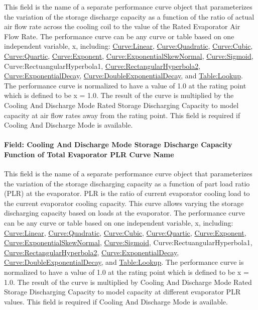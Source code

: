 This field is the name of a separate performance curve object that parameterizes the variation of the storage discharge capacity as a function of the ratio of actual air flow rate across the cooling coil to the value of the Rated Evaporator Air Flow Rate. The performance curve can be any curve or table based on one independent variable, x, including: \hyperref[curvelinear]{Curve:Linear}, \hyperref[curvequadratic]{Curve:Quadratic}, \hyperref[curvecubic]{Curve:Cubic}, \hyperref[curvequartic]{Curve:Quartic}, \hyperref[curveexponent]{Curve:Exponent}, \hyperref[curveexponentialskewnormal]{Curve:ExponentialSkewNormal}, \hyperref[curvesigmoid]{Curve:Sigmoid}, Curve:RectuangularHyperbola1, \hyperref[curverectangularhyperbola2]{Curve:RectangularHyperbola2}, \hyperref[curveexponentialdecay]{Curve:ExponentialDecay}, \hyperref[curvedoubleexponentialdecay]{Curve:DoubleExponentialDecay}, and \hyperref[tablelookup]{Table:Lookup}. The performance curve is normalized to have a value of 1.0 at the rating point which is defined to be x = 1.0. The result of the curve is multiplied by the Cooling And Discharge Mode Rated Storage Discharging Capacity to model capacity at air flow rates away from the rating point. This field is required if Cooling And Discharge Mode is available.

\paragraph{Field: Cooling And Discharge Mode Storage Discharge Capacity Function of Total Evaporator PLR Curve Name}\label{field-cooling-and-discharge-mode-storage-discharge-capacity-function-of-total-evaporator-plr-curve-name}

This field is the name of a separate performance curve object that parameterizes the variation of the storage discharging capacity as a function of part load ratio (PLR) at the evaporator. PLR is the ratio of current evaporator cooling load to the current evaporator cooling capacity. This curve allows varying the storage discharging capacity based on loads at the evaporator. The performance curve can be any curve or table based on one independent variable, x, including: \hyperref[curvelinear]{Curve:Linear}, \hyperref[curvequadratic]{Curve:Quadratic}, \hyperref[curvecubic]{Curve:Cubic}, \hyperref[curvequartic]{Curve:Quartic}, \hyperref[curveexponent]{Curve:Exponent}, \hyperref[curveexponentialskewnormal]{Curve:ExponentialSkewNormal}, \hyperref[curvesigmoid]{Curve:Sigmoid}, Curve:RectuangularHyperbola1, \hyperref[curverectangularhyperbola2]{Curve:RectangularHyperbola2}, \hyperref[curveexponentialdecay]{Curve:ExponentialDecay}, \hyperref[curvedoubleexponentialdecay]{Curve:DoubleExponentialDecay}, and \hyperref[tablelookup]{Table:Lookup}. The performance curve is normalized to have a value of 1.0 at the rating point which is defined to be x = 1.0. The result of the curve is multiplied by Cooling And Discharge Mode Rated Storage Discharging Capacity to model capacity at different evaporator PLR values. This field is required if Cooling And Discharge Mode is available.

